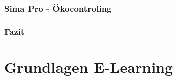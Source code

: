 \documentclass[a4paper, 12pt, twoside, BCOR=20mm, DIV=calc, abstracton, parskip=half*, toc=bibliography, toc=listof, headsepline, footsepline, headings=small, numbers=enddot]{scrreprt}
\begin{document}
	\subsection{Sima Pro - Ökocontroling}
	
	\subsection{Fazit}
	
	
	\chapter{Grundlagen E-Learning}
\end{document}
